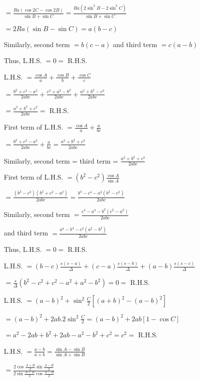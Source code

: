   $= \frac{Ra(\cos 2C - \cos 2B)}{\sin B + \sin C} = \frac{Ra(2\sin^2B - 2\sin^2C)}{\sin B + \sin C}$

  $= 2Ra(\sin B - \sin C) = a(b - c)$

  Similarly, second term $= b(c - a)$ and third term $= c(a - b)$

  Thus, L.H.S. $= 0 =$ R.H.S.

\item L.H.S. $= \frac{\cos A}{a} + \frac{\cos B}{b} + \frac{\cos C}{c}$

  $= \frac{b^2 + c^2 - a^2}{2abc} + \frac{c^2 + a^2 - b^2}{2abc} + \frac{a^2 + b^2 - c^2}{2abc}$

  $= \frac{a^2 + b^2 + c^2}{2abc} =$ R.H.S.

\item First term of L.H.S. $= \frac{\cos A}{a} + \frac{a}{bc}$

  $= \frac{b^2 + c^2 - a^2}{2abc} + \frac{a}{bc} = \frac{a^2 + b^2 + c^2}{2abc}$

  Similarly, second term = third term = $\frac{a^2 + b^2 + c^2}{2abc}$

\item First term of L.H.S. $= (b^2 - c^2)\frac{\cos A}{\sin A}$

  $= \frac{(b^2 - c^2)(b^2 + c^2 - a^2)}{2abc} = \frac{b^4 - c^4 - a^2(b^2 - c^2)}{2abc}$

  Similarly, second term $= \frac{c^4 - a^4 - b^2(c^2 - a^2)}{2abc}$

  and third term $= \frac{a^4 - b^4 - c^2(a^2 - b^2)}{2abc}$

  Thus, L.H.S. $= 0 =$ R.H.S.

\item L.H.S. $= (b - c)\frac{s(s - a)}{\Delta} + (c - a)\frac{s(s - b)}{\Delta} + (a - b)\frac{s(s - c)}{\Delta}$

  $= \frac{s}{\Delta}(b^2 - c^2 + c^2 - a^2 + a^2 - b^2) = 0 =$ R.H.S.

\item L.H.S. $= (a - b)^2 + \sin^2\frac{C}{2}\left[(a + b)^2 - (a - b)^2\right]$

  $= (a - b)^2 + 2ab.2\sin^2\frac{C}{2} = (a - b)^2 + 2ab[1 - \cos C]$

  $= a^2 - 2ab + b^2 +2ab - a^2 - b^2 + c^2 = c^2 =$ R.H.S.

\item L.H.S. $= \frac{a - b}{a + b} = \frac{\sin A - \sin B}{\sin A + \sin B}$

  $= \frac{2\cos\frac{A + B}{2}\sin\frac{A - B}{2}}{2\sin\frac{A = B}{2}\cos\frac{A - B}{2}}$

